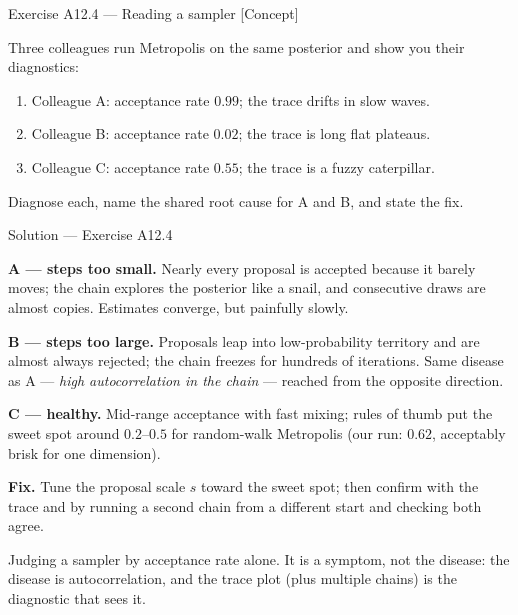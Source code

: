 \documentclass[aspectratio=169,11pt]{beamer}
\begin{document}
\begin{frame}{Exercise A12.4 --- Reading a sampler [Concept]}
  \begin{exercise}
    Three colleagues run Metropolis on the same posterior and show you their
    diagnostics:
    \begin{enumerate}
      \item Colleague A: acceptance rate $0.99$; the trace drifts in slow waves.
      \item Colleague B: acceptance rate $0.02$; the trace is long flat plateaus.
      \item Colleague C: acceptance rate $0.55$; the trace is a fuzzy caterpillar.
    \end{enumerate}
    Diagnose each, name the shared root cause for A and B, and state the fix.
  \end{exercise}
\end{frame}

\begin{frame}{Solution --- Exercise A12.4}
  \begin{solutionbox}
    \footnotesize
    \textbf{A --- steps too small.} Nearly every proposal is accepted because it
    barely moves; the chain explores the posterior like a snail, and consecutive
    draws are almost copies. Estimates converge, but painfully slowly.
    \par\smallskip
    \textbf{B --- steps too large.} Proposals leap into low-probability territory
    and are almost always rejected; the chain freezes for hundreds of iterations.
    Same disease as A --- \emph{high autocorrelation in the chain} --- reached from
    the opposite direction.
    \par\smallskip
    \textbf{C --- healthy.} Mid-range acceptance with fast mixing; rules of thumb
    put the sweet spot around $0.2$--$0.5$ for random-walk Metropolis (our run:
    $0.62$, acceptably brisk for one dimension).
    \par\smallskip
    \textbf{Fix.} Tune the proposal scale $s$ toward the sweet spot; then confirm
    with the trace and by running a second chain from a different start and
    checking both agree.
  \end{solutionbox}
  \begin{mistake}
    Judging a sampler by acceptance rate alone. It is a symptom, not the disease:
    the disease is autocorrelation, and the trace plot (plus multiple chains) is
    the diagnostic that sees it.
  \end{mistake}
\end{frame}
\end{document}
